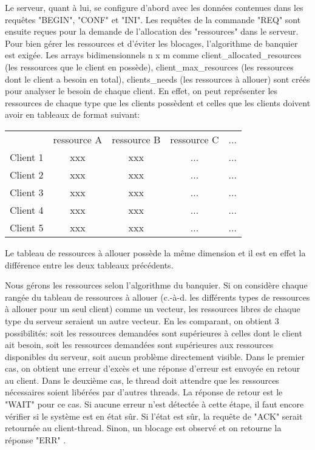 \documentclass[11pt]{article}
\begin{document}
Le serveur, quant à lui, se configure d'abord avec les données contenues dans les requêtes "BEGIN", "CONF" et "INI". Les requêtes de la commande "REQ" sont ensuite reçues pour la demande de l'allocation des "ressources" dans le serveur. Pour bien gérer les ressources et d'éviter les blocages, l'algorithme de banquier est exigée. Les arrays bidimensionnels n x m comme client\_allocated\_resources (les ressources que le client en possède), client\_max\_resources (les ressources dont le client a besoin en total), clients\_needs (les ressources à allouer) sont créés pour analyser le besoin de chaque client. En effet, on peut représenter les ressources de chaque type que les clients possèdent et celles que les clients doivent avoir en tableaux de format suivant:

\begin{center}
\begin{tabular}{ |c|c|c|c|c| } 
 \hline
  & ressource A & ressource B & ressource C  & ...\\ 
 Client 1 & xxx & xxx & ... & ...\\ 
 Client 2 & xxx & xxx & ... & ...\\ 
 Client 3 & xxx & xxx & ... & ...\\ 
 Client 4 & xxx & xxx & ... & ...\\ 
 Client 5 & xxx & xxx & ... & ...\\ 
 \hline
\end{tabular}
\end{center}
Le tableau de ressources à allouer possède la même dimension et il est en effet la différence entre les deux tableaux précédents. 

Nous gérons les ressources selon l'algorithme du banquier. Si on considère chaque rangée du tableau de ressources à allouer (c.-à-d. les différents types de ressources à allouer pour un seul client) comme un vecteur, les ressources libres de chaque type du serveur seraient un autre vecteur. En les comparant, on obtient 3 possibilités: soit les ressources demandées sont supérieures à celles dont le client ait besoin, soit les ressources demandées sont supérieures aux ressources disponibles du serveur, soit aucun problème directement visible. Dans le premier cas, on obtient une erreur d'excès et une réponse d'erreur est envoyée en retour au client. Dans le deuxième cas, le thread doit attendre que les ressources nécessaires soient libérées par d'autres threads. La réponse de retour est le "WAIT" pour ce cas. Si aucune erreur n'est détectée à cette étape, il faut encore vérifier si le système est en état sûr. Si l'état est sûr, la requête de "ACK" serait retournée au client-thread. Sinon, un blocage est observé et on retourne la réponse "ERR" .
\end{document}
